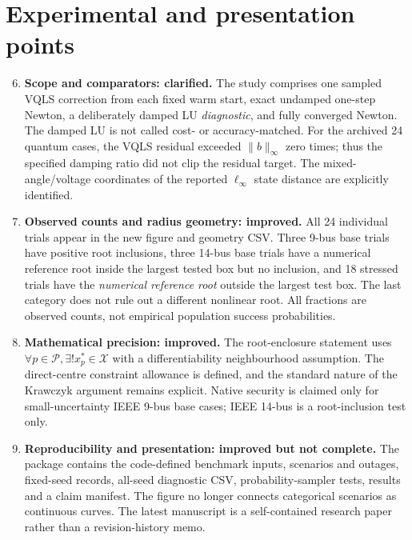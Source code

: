 \documentclass[11pt,a4paper]{article}
\begin{document}
\section*{Experimental and presentation points}
\begin{enumerate}\setcounter{enumi}{5}
\item \textbf{Scope and comparators: clarified.} The study comprises one sampled VQLS correction from each fixed warm start, exact undamped one-step Newton, a deliberately damped LU \emph{diagnostic}, and fully converged Newton. The damped LU is not called cost- or accuracy-matched. For the archived 24 quantum cases, the VQLS residual exceeded $\|b\|_\infty$ zero times; thus the specified damping ratio did not clip the residual target. The mixed-angle/voltage coordinates of the reported $\ell_\infty$ state distance are explicitly identified.

\item \textbf{Observed counts and radius geometry: improved.} All 24 individual trials appear in the new figure and geometry CSV. Three 9-bus base trials have positive root inclusions, three 14-bus base trials have a numerical reference root inside the largest tested box but no inclusion, and 18 stressed trials have the \emph{numerical reference root} outside the largest test box. The last category does not rule out a different nonlinear root. All fractions are observed counts, not empirical population success probabilities.

\item \textbf{Mathematical precision: improved.} The root-enclosure statement uses $\forall p\in\mathcal P,\exists! x_p^*\in\mathcal X$ with a differentiability neighbourhood assumption. The direct-centre constraint allowance is defined, and the standard nature of the Krawczyk argument remains explicit. Native security is claimed only for small-uncertainty IEEE 9-bus base cases; IEEE 14-bus is a root-inclusion test only.

\item \textbf{Reproducibility and presentation: improved but not complete.} The package contains the code-defined benchmark inputs, scenarios and outages, fixed-seed records, all-seed diagnostic CSV, probability-sampler tests, results and a claim manifest. The figure no longer connects categorical scenarios as continuous curves. The latest manuscript is a self-contained research paper rather than a revision-history memo.
\end{enumerate}
\end{document}
